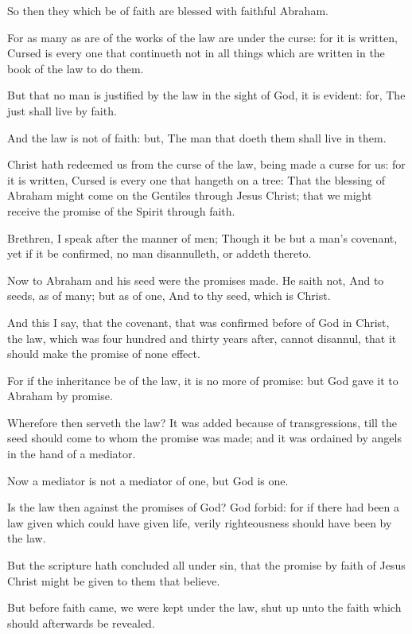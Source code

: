 \Verse So then they which be of faith are blessed with faithful Abraham.

\Verse For as many as are of the works of the law are under the curse: for it is written, Cursed is every one that continueth not in all things which are written in the book of the law to do them.

\Verse But that no man is justified by the law in the sight of God, it is evident: for, The just shall live by faith.

\Verse And the law is not of faith: but, The man that doeth them shall live in them.

\Verse Christ hath redeemed us from the curse of the law, being made a curse for us: for it is written, Cursed is every one that hangeth on a tree: \Verse That the blessing of Abraham might come on the Gentiles through Jesus Christ; that we might receive the promise of the Spirit through faith.

\Verse Brethren, I speak after the manner of men; Though it be but a man's covenant, yet if it be confirmed, no man disannulleth, or addeth thereto.

\Verse Now to Abraham and his seed were the promises made. He saith not, And to seeds, as of many; but as of one, And to thy seed, which is Christ.

\Verse And this I say, that the covenant, that was confirmed before of God in Christ, the law, which was four hundred and thirty years after, cannot disannul, that it should make the promise of none effect.

\Verse For if the inheritance be of the law, it is no more of promise: but God gave it to Abraham by promise.

\Verse Wherefore then serveth the law? It was added because of transgressions, till the seed should come to whom the promise was made; and it was ordained by angels in the hand of a mediator.

\Verse Now a mediator is not a mediator of one, but God is one.

\Verse Is the law then against the promises of God? God forbid: for if there had been a law given which could have given life, verily righteousness should have been by the law.

\Verse But the scripture hath concluded all under sin, that the promise by faith of Jesus Christ might be given to them that believe.

\Verse But before faith came, we were kept under the law, shut up unto the faith which should afterwards be revealed.

